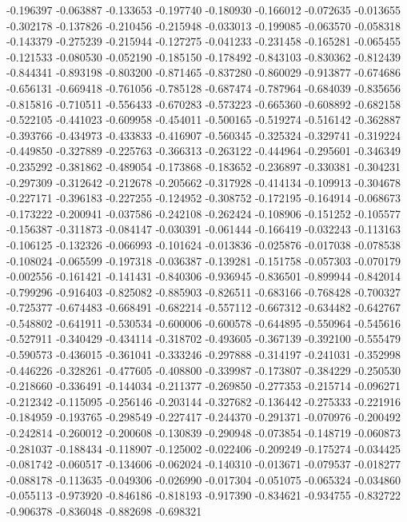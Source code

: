-0.196397
-0.063887
-0.133653
-0.197740
-0.180930
-0.166012
-0.072635
-0.013655
-0.302178
-0.137826
-0.210456
-0.215948
-0.033013
-0.199085
-0.063570
-0.058318
-0.143379
-0.275239
-0.215944
-0.127275
-0.041233
-0.231458
-0.165281
-0.065455
-0.121533
-0.080530
-0.052190
-0.185150
-0.178492
-0.843103
-0.830362
-0.812439
-0.844341
-0.893198
-0.803200
-0.871465
-0.837280
-0.860029
-0.913877
-0.674686
-0.656131
-0.669418
-0.761056
-0.785128
-0.687474
-0.787964
-0.684039
-0.835656
-0.815816
-0.710511
-0.556433
-0.670283
-0.573223
-0.665360
-0.608892
-0.682158
-0.522105
-0.441023
-0.609958
-0.454011
-0.500165
-0.519274
-0.516142
-0.362887
-0.393766
-0.434973
-0.433833
-0.416907
-0.560345
-0.325324
-0.329741
-0.319224
-0.449850
-0.327889
-0.225763
-0.366313
-0.263122
-0.444964
-0.295601
-0.346349
-0.235292
-0.381862
-0.489054
-0.173868
-0.183652
-0.236897
-0.330381
-0.304231
-0.297309
-0.312642
-0.212678
-0.205662
-0.317928
-0.414134
-0.109913
-0.304678
-0.227171
-0.396183
-0.227255
-0.124952
-0.308752
-0.172195
-0.164914
-0.068673
-0.173222
-0.200941
-0.037586
-0.242108
-0.262424
-0.108906
-0.151252
-0.105577
-0.156387
-0.311873
-0.084147
-0.030391
-0.061444
-0.166419
-0.032243
-0.113163
-0.106125
-0.132326
-0.066993
-0.101624
-0.013836
-0.025876
-0.017038
-0.078538
-0.108024
-0.065599
-0.197318
-0.036387
-0.139281
-0.151758
-0.057303
-0.070179
-0.002556
-0.161421
-0.141431
-0.840306
-0.936945
-0.836501
-0.899944
-0.842014
-0.799296
-0.916403
-0.825082
-0.885903
-0.826511
-0.683166
-0.768428
-0.700327
-0.725377
-0.674483
-0.668491
-0.682214
-0.557112
-0.667312
-0.634482
-0.642767
-0.548802
-0.641911
-0.530534
-0.600006
-0.600578
-0.644895
-0.550964
-0.545616
-0.527911
-0.340429
-0.434114
-0.318702
-0.493605
-0.367139
-0.392100
-0.555479
-0.590573
-0.436015
-0.361041
-0.333246
-0.297888
-0.314197
-0.241031
-0.352998
-0.446226
-0.328261
-0.477605
-0.408800
-0.339987
-0.173807
-0.384229
-0.250530
-0.218660
-0.336491
-0.144034
-0.211377
-0.269850
-0.277353
-0.215714
-0.096271
-0.212342
-0.115095
-0.256146
-0.203144
-0.327682
-0.136442
-0.275333
-0.221916
-0.184959
-0.193765
-0.298549
-0.227417
-0.244370
-0.291371
-0.070976
-0.200492
-0.242814
-0.260012
-0.200608
-0.130839
-0.290948
-0.073854
-0.148719
-0.060873
-0.281037
-0.188434
-0.118907
-0.125002
-0.022406
-0.209249
-0.175274
-0.034425
-0.081742
-0.060517
-0.134606
-0.062024
-0.140310
-0.013671
-0.079537
-0.018277
-0.088178
-0.113635
-0.049306
-0.026990
-0.017304
-0.051075
-0.065324
-0.034860
-0.055113
-0.973920
-0.846186
-0.818193
-0.917390
-0.834621
-0.934755
-0.832722
-0.906378
-0.836048
-0.882698
-0.698321
